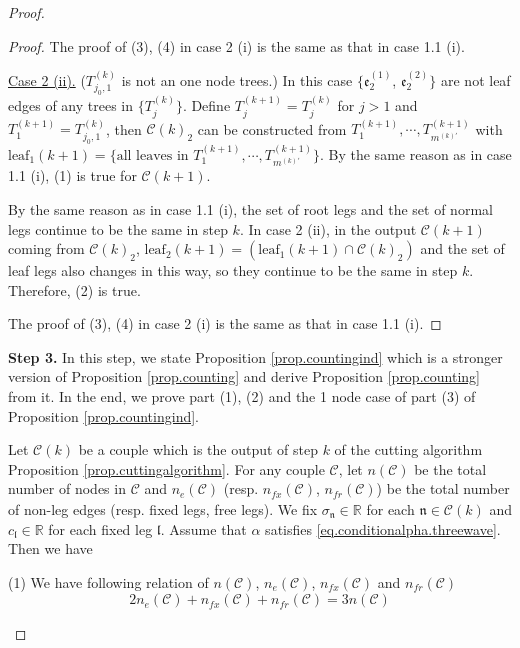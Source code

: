 \begin{proof}
\begin{proof}
The proof of (3), (4) in case 2 (i) is the same as that in case 1.1 (i).

\underline{Case 2 (ii).} ($T^{(k)}_{j_0,1}$ is not an one node trees.) In this case $\{\mathfrak{e}_{2}^{(1)}$, $\mathfrak{e}_{2}^{(2)}\}$ are not leaf edges of any trees in $\{T_{j}^{(k)}\}$. Define $T^{(k+1)}_{j}=T^{(k)}_{j}$ for $j>1$ and $T^{(k+1)}_{1}=T^{(k)}_{j_0,1}$, then $\mathcal{C}(k)_2$ can be constructed from $T^{(k+1)}_1, \cdots, T^{(k+1)}_{m^{(k)'}}$ with $\text{leaf}_1(k+1)=\{\text{all leaves in }T^{(k+1)}_1, \cdots, T^{(k+1)}_{m^{(k)'}}\}$. By the same reason as in case 1.1 (i), (1) is true for $\mathcal{C}(k+1)$.

By the same reason as in case 1.1 (i), the set of root legs and the set of normal legs continue to be the same in step $k$. In case 2 (ii), in the output $\mathcal{C}(k+1)$ coming from $\mathcal{C}(k)_2$, $\text{leaf}_2(k+1)=(\text{leaf}_1(k+1)\cap \mathcal{C}(k)_2)$ and the set of leaf legs also changes in this way, so they continue to be the same in step $k$. Therefore, (2) is true.

The proof of (3), (4) in case 2 (i) is the same as that in case 1.1 (i).
\end{proof}



\textbf{Step 3.} In this step, we state Proposition \ref{prop.countingind} which is a stronger version of Proposition \ref{prop.counting} and derive Proposition \ref{prop.counting} from it. In the end, we prove part (1), (2) and the 1 node case of part (3) of Proposition \ref{prop.countingind}.


\begin{prop}\label{prop.countingind}
Let $\mathcal{C}(k)$ be a couple which is the output of step $k$ of the cutting algorithm Proposition \ref{prop.cuttingalgorithm}. For any couple $\mathcal{C}$, let $n(\mathcal{C})$ be the total number of nodes in $\mathcal{C}$ and $n_e(\mathcal{C})$ (resp. $n_{fx}(\mathcal{C})$, $n_{\textit{fr}}(\mathcal{C})$) be the total number of non-leg edges (resp. fixed legs, free legs). We fix $\sigma_{\mathfrak{n}}\in\mathbb{R}$ for each $\mathfrak{n}\in \mathcal{C}(k)$ and $c_{\mathfrak{l}}\in \mathbb{R}$ for each fixed leg $\mathfrak{l}$. Assume that $\alpha$ satisfies \eqref{eq.conditionalpha.threewave}. Then we have

(1) We have following relation of $n(\mathcal{C})$, $n_e(\mathcal{C})$, $n_{fx}(\mathcal{C})$ and $n_{\textit{fr}}(\mathcal{C})$
\begin{equation}
    2n_e(\mathcal{C})+n_{fx}(\mathcal{C})+n_{\textit{fr}}(\mathcal{C})=3n(\mathcal{C})
\end{equation}


\end{prop}
\end{proof}
